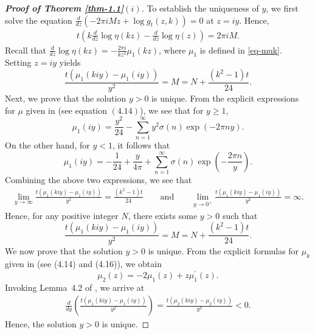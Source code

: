 \documentclass[11pt]{amsart}
\theoremstyle{plain}
\numberwithin{equation}{section}
\begin{document}
	\begin{proof}[\textbf{\boldmath Proof of Theorem \ref{thm-1.1}$(i)$}]
		To establish the uniqueness of $y$, we first solve the equation
		$\frac{d}{dz}\left(-2\pi iMz+\log g_t(z,k)\right)=0$ at $z=iy.$ Hence, 
		\begin{align*}%
			t\left(k\frac{d}{dz}\log \eta(kz)-\frac{d}{dz}\log \eta(z)\right)=2\pi iM.  
		\end{align*}
		Recall that $\frac{d}{dz}\log \eta(kz) = -\frac{2\pi i}{k z^2}\mu_1(kz)$, where $\mu_1$ is defined in \eqref{eq-muk}. Setting $z=iy$ yields
		\begin{equation*}%
			\frac{t(\mu_{1}(kiy)-\mu_1(iy))}{y^{2}}=M=N+\frac{(k^{2}-1)t}{24}.   
		\end{equation*}
		Next, we prove that the solution $y>0$ is unique. From the explicit 
		expressions for $\mu$ given in \cite{tyler} (see equation $(4.14)$), we see that for $y\ge 1$,
		\begin{equation}\label{eq-pf11}
			\mu_{1}(iy)=\frac{y^{2}}{24}-\sum_{n=1}^{\infty}y^{2}\sigma(n)\exp(-2\pi ny). 
		\end{equation} 
		On the other hand, for $y < 1$, it follows that
		\begin{equation}\label{eq-pf12}
			\mu_{1}(iy)=-\frac{1}{24}+\frac{y}{4\pi}+\sum_{n=1}^{\infty}\sigma(n)\exp\left(-\frac{2\pi n}{y}\right).
		\end{equation}
		Combining the above two expressions, we see that
		\begin{align*}
			\lim_{y\to \infty} \frac{t(\mu_{1}(kiy)-\mu_1(iy))}{y^{2}} =\frac{(k^{2}-1)t}{24} \qquad \text{and}\qquad\lim_{y\to 0^{+}}\frac{t(\mu_{1}(kiy)-\mu_1(iy))}{y^{2}}=\infty.
		\end{align*}
		Hence, for any positive integer $N$, there exists some $y > 0$ such that
		\begin{equation*}%
			\frac{t(\mu_{1}(kiy)-\mu_1(iy))}{y^{2}}=M=N+\frac{(k^{2}-1)t}{24}.   
		\end{equation*}
		We now prove that the solution $y>0$ is unique. From the explicit 
		formulas for $\mu_k$ given in \cite{tyler} (see (4.14) and (4.16)), 
		we obtain $$\mu_{2}(z)=-2\mu_{1}(z)+z\mu_{1}^{\prime}(z).$$ 
		Invoking Lemma~4.2 of \cite{tyler}, we arrive at
		\begin{align*}
			\frac{d}{dy}\left(\frac{t(\mu_{1}(kiy)-\mu_1(iy))}{y^{2}}\right)=\frac{t(\mu_{2}(kiy)-\mu_2(iy))}{y^{3}}<0.   
		\end{align*}
		Hence, the solution $y>0$ is unique.
	\end{proof}
\end{document}
